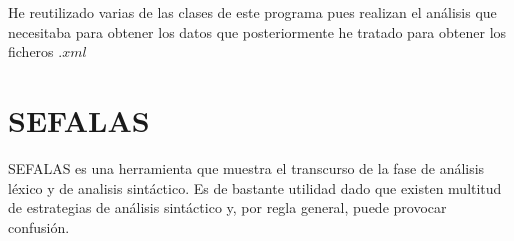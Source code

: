 He reutilizado varias de las clases de este programa pues realizan el análisis que necesitaba para obtener los datos que posteriormente he tratado para obtener los ficheros $.xml$ 


\section{SEFALAS}

SEFALAS es una herramienta que muestra el transcurso de la fase de análisis léxico y de analisis sintáctico. Es de bastante utilidad dado que existen multitud de estrategias de análisis sintáctico y, por regla general, puede provocar confusión.


